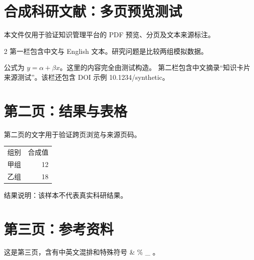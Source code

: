 \documentclass{ctexart}
\begin{document}
\section*{合成科研文献：多页预览测试}
本文件仅用于验证知识管理平台的 PDF 预览、分页及文本来源标注。
\begin{multicols}{2}
第一栏包含中文与 English 文本。研究问题是比较两组模拟数据。

公式为 $y=\alpha+\beta x$。这里的内容完全由测试构造。
\columnbreak
第二栏包含中文摘录“知识卡片来源测试”。该栏还包含 DOI 示例 10.1234/synthetic。
\end{multicols}
\newpage
\section*{第二页：结果与表格}
第二页的文字用于验证跨页浏览与来源页码。
\begin{tabular}{lr}
组别 & 合成值 \\
甲组 & 12 \\
乙组 & 18
\end{tabular}

结果说明：该样本不代表真实科研结果。
\newpage
\section*{第三页：参考资料}
这是第三页，含有中英文混排和特殊符号 \& \% \_ 。
\end{document}
